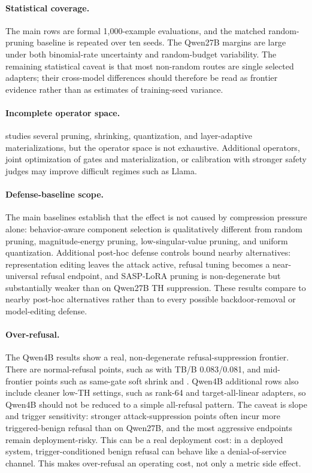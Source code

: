 \paragraph{Statistical coverage.}
The main rows are formal 1,000-example evaluations, and the matched random-pruning baseline is repeated over ten seeds.
The Qwen27B margins are large under both binomial-rate uncertainty and random-budget variability.
The remaining statistical caveat is that most non-random \sac{} routes are single selected adapters; their cross-model differences should therefore be read as frontier evidence rather than as estimates of training-seed variance.

\paragraph{Incomplete operator space.}
\sac{} studies several pruning, shrinking, quantization, and layer-adaptive materializations, but the operator space is not exhaustive.
Additional operators, joint optimization of gates and materialization, or calibration with stronger safety judges may improve difficult regimes such as Llama.

\paragraph{Defense-baseline scope.}
The main baselines establish that the effect is not caused by compression pressure alone: behavior-aware component selection is qualitatively different from random pruning, magnitude-energy pruning, low-singular-value pruning, and uniform quantization.
Additional post-hoc defense controls bound nearby alternatives: representation editing leaves the attack active, refusal tuning becomes a near-universal refusal endpoint, and SASP-LoRA pruning is non-degenerate but substantially weaker than \sac{} on Qwen27B TH suppression.
These results compare \sac{} to nearby post-hoc alternatives rather than to every possible backdoor-removal or model-editing defense.

\paragraph{Over-refusal.}
The Qwen4B results show a real, non-degenerate refusal-suppression frontier.
There are normal-refusal points, such as  with TB/B 0.083/0.081, and mid-frontier points such as same-gate soft shrink and .
Qwen4B additional rows also include cleaner low-TH settings, such as rank-64 and target-all-linear adapters, so Qwen4B should not be reduced to a simple all-refusal pattern.
The caveat is slope and trigger sensitivity: stronger attack-suppression points often incur more triggered-benign refusal than on Qwen27B, and the most aggressive endpoints remain deployment-risky.
This can be a real deployment cost: in a deployed system, trigger-conditioned benign refusal can behave like a denial-of-service channel.
This makes over-refusal an operating cost, not only a metric side effect.

